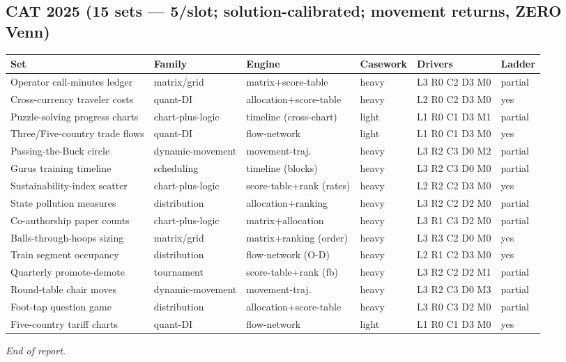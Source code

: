 \documentclass[11pt,a4paper]{article}
\newcommand{\invtab}{\footnotesize}
\begin{document}
\subsection{CAT 2025 (15 sets --- 5/slot; solution-calibrated; movement returns, ZERO Venn)}
{\invtab
\begin{longtable}{p{3.0cm}p{2.05cm}p{2.5cm}p{1.2cm}p{2.05cm}p{1.7cm}}
\toprule
\textbf{Set} & \textbf{Family} & \textbf{Engine} & \textbf{Casework} & \textbf{Drivers} & \textbf{Ladder} \\
\midrule
\endhead
Operator call-minutes ledger & matrix/grid & matrix+score-table & heavy & L3 R0 C2 D3 M0 & partial \\
Cross-currency traveler costs & quant-DI & allocation+score-table & heavy & L2 R0 C2 D3 M0 & yes \\
Puzzle-solving progress charts & chart-plus-logic & timeline (cross-chart) & light & L1 R0 C1 D3 M1 & partial \\
Three/Five-country trade flows & quant-DI & flow-network & light & L1 R0 C1 D3 M0 & yes \\
Passing-the-Buck circle & dynamic-movement & movement-traj. & heavy & L3 R2 C3 D0 M2 & partial \\
Gurus training timeline & scheduling & timeline (blocks) & heavy & L3 R2 C3 D0 M0 & partial \\
Sustainability-index scatter & chart-plus-logic & score-table+rank (rates) & heavy & L2 R2 C2 D3 M0 & yes \\
State pollution measures & distribution & allocation+ranking & heavy & L3 R2 C2 D2 M0 & partial \\
Co-authorship paper counts & chart-plus-logic & matrix+allocation & heavy & L3 R1 C3 D2 M0 & partial \\
Balls-through-hoops sizing & matrix/grid & matrix+ranking (order) & heavy & L3 R3 C2 D0 M0 & yes \\
Train segment occupancy & distribution & flow-network (O-D) & heavy & L2 R1 C2 D3 M0 & yes \\
Quarterly promote-demote & tournament & score-table+rank (fb) & heavy & L3 R2 C2 D2 M1 & partial \\
Round-table chair moves & dynamic-movement & movement-traj. & heavy & L3 R2 C3 D0 M3 & partial \\
Foot-tap question game & distribution & allocation+score-table & heavy & L3 R0 C3 D2 M0 & partial \\
Five-country tariff charts & quant-DI & flow-network & light & L1 R0 C1 D3 M0 & yes \\
\bottomrule
\end{longtable}}

\vspace{0.6cm}
\begin{center}\textit{End of report.}\end{center}
\end{document}
